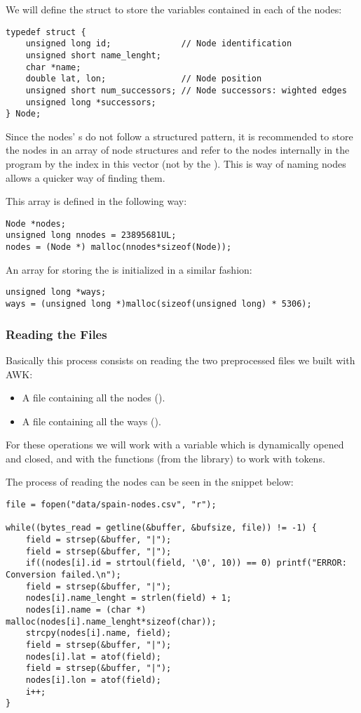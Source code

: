 We will define the  struct to store the variables contained in each of the nodes:
\begin{lstlisting}
typedef struct {
	unsigned long id;              // Node identification
	unsigned short name_lenght;
	char *name;
	double lat, lon;               // Node position
	unsigned short num_successors; // Node successors: wighted edges
	unsigned long *successors;
} Node;
\end{lstlisting}

Since the nodes' s do not follow a structured pattern, it is recommended to store the nodes in an array of node structures and refer to the nodes internally in the program by the index in this vector (not by the ). This is way of naming nodes allows a quicker way of finding them.

This  array is defined in the following way:
\begin{lstlisting}
Node *nodes;
unsigned long nnodes = 23895681UL;
nodes = (Node *) malloc(nnodes*sizeof(Node));
\end{lstlisting}

An array for storing the  is initialized in a similar fashion:
\begin{lstlisting}
unsigned long *ways;
ways = (unsigned long *)malloc(sizeof(unsigned long) * 5306);
\end{lstlisting}

\subsubsection*{Reading the  Files}
Basically this process consists on reading the two preprocessed files we built with AWK:
\begin{itemize}
	\item A file containing all the nodes ().
    \item A file containing all the ways ().
\end{itemize}

For these operations we will work with a  variable which is dynamically opened and closed, and with the  functions (from the  library) to work with tokens.

The process of reading the nodes can be seen in the snippet below:
\begin{lstlisting}
file = fopen("data/spain-nodes.csv", "r");

while((bytes_read = getline(&buffer, &bufsize, file)) != -1) {
	field = strsep(&buffer, "|");
	field = strsep(&buffer, "|");
	if((nodes[i].id = strtoul(field, '\0', 10)) == 0) printf("ERROR: Conversion failed.\n");
	field = strsep(&buffer, "|");
	nodes[i].name_lenght = strlen(field) + 1;
	nodes[i].name = (char *) malloc(nodes[i].name_lenght*sizeof(char));
	strcpy(nodes[i].name, field);
	field = strsep(&buffer, "|");
	nodes[i].lat = atof(field);
	field = strsep(&buffer, "|");
	nodes[i].lon = atof(field);
	i++;
}
\end{lstlisting}

